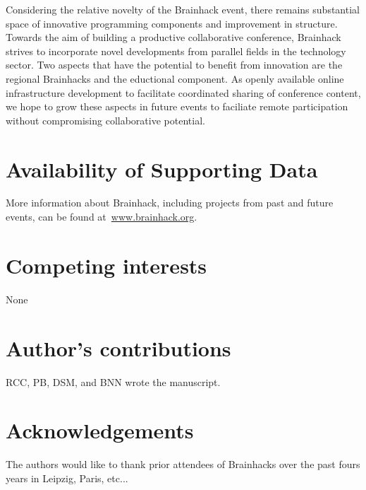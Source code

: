 \documentclass[11pt]{bmc_article_s50}
\begin{document}
Considering the relative novelty of the Brainhack event, there remains substantial space of innovative programming components and improvement in structure. Towards the aim of building a productive collaborative conference, Brainhack strives to incorporate novel developments from parallel fields in the technology sector. Two aspects that have the potential to benefit from innovation are the regional Brainhacks and the eductional component. As openly available online infrastructure development to facilitate coordinated sharing of conference content, we hope to grow these aspects in future events to faciliate remote participation without compromising collaborative potential.

\newpage
\section*{Availability of Supporting Data}
More information about Brainhack, including projects from past and future events, can be found at~\href{http://www.brainhack.org}{www.brainhack.org}.

\section*{Competing interests}
None

\section*{Author's contributions}
RCC, PB, DSM, and BNN wrote the manuscript.

\section*{Acknowledgements}
The authors would like to thank prior attendees of Brainhacks over the past fours years in Leipzig, Paris, etc... 






 
 
\end{document}

